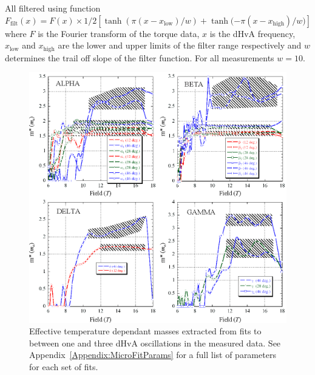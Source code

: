 All filtered using function $\textit{F}_{\textrm{filt}}(x) = \textit{F}(x) \times 1/2 [\tanh{(\pi(x - x_{\textrm{low}})/w)} + \tanh{(-\pi(x - x_{\textrm{high}})/w})]$ where $\textit{F}$ is the Fourier transform of the torque data, $x$ is the dHvA frequency, $x_{\textrm{low}}$ and $x_{\textrm{high}}$ are the lower and upper limits of the filter range respectively and $w$ determines the trail off slope of the filter function. For all measurements $w=10$.
\begin{figure}[htbp]
    \begin{center}
        \includegraphics[scale=0.7]{Chapter-dHvABaFe2P2/Figures/Mass/MicroFits/MicroFits}
        \caption{Effective temperature dependant masses extracted from fits to between one and three dHvA oscillations in the measured data. See Appendix~\ref{Appendix:MicroFitParams} for a full list of parameters for each set of fits.}
        \label{Fig:ResD:MicroFits}
    \end{center}
\end{figure}
